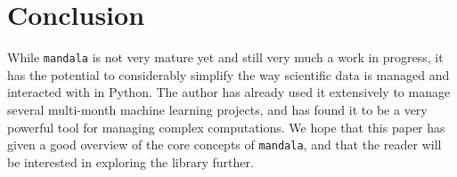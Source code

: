 \documentclass{article} %
\begin{document}
\section{Conclusion}
\label{section:}

While \texttt{mandala} is not very mature yet and still very much a work in
progress, it has the potential to considerably simplify the way scientific data
is managed and interacted with in Python. The author has already used it
extensively to manage several multi-month machine learning projects, and has
found it to be a very powerful tool for managing complex computations. We hope
that this paper has given a good overview of the core concepts of
\texttt{mandala}, and that the reader will be interested in exploring the
library further.




\end{document}
